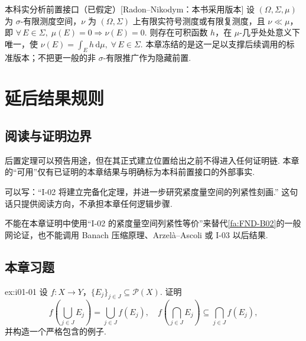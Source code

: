 \begin{FALightBox}{本科实分析前置接口（已假定）}[Radon--Nikodym：本书采用版本]
设 \(\displaystyle (\Omega,\Sigma,\mu)\) 为 \(\displaystyle \sigma\)-有限测度空间，\(\displaystyle \nu\) 为 \(\displaystyle (\Omega,\Sigma)\) 上有限实符号测度或有限复测度，且 \(\displaystyle \nu\ll\mu\)，即 \(\displaystyle \forall\,E\in\Sigma,\; \mu(E)=0\Longrightarrow\nu(E)=0\).
则存在可积函数 \(\displaystyle h\)，在 \(\displaystyle \mu\)-几乎处处意义下唯一，使 \(\displaystyle \nu(E)=\int_E h\,\mathrm{d}\mu, \; \forall\,E\in\Sigma\).
本章冻结的是这一足以支撑后续调用的标准版本；不把更一般的非 \(\displaystyle \sigma\)-有限推广作为隐藏前置.
\end{FALightBox}

\section{延后结果规则}\label{sec:i01-deferred}

\subsection{阅读与证明边界}

后置定理可以预告用途，但在其正式建立位置给出之前不得进入任何证明链. 本章的“可用”仅有已证明的本章结果与明确标为本科前置接口的外部事实.

\begin{FAExample}[合法预告]
可以写：“I-02 将建立完备化定理，并进一步研究紧度量空间的列紧性刻画.” 这句话只提供阅读方向，不承担本章任何逻辑步骤.
\end{FAExample}

\begin{FAWarning}[非法前向调用]
不能在本章证明中使用“I-02 的紧度量空间列紧性等价”来替代\autoref{fa:FND-B02}的一般网论证，也不能调用 Banach 压缩原理、Arzelà--Ascoli 或 I-03 以后结果.
\end{FAWarning}

\subsection{本章习题}\label{sec:i01-exercises}

\begin{FAExercise}[像与原像的量词核验]{ex:i01-01}
设 \(\displaystyle f:X\to Y\)，\(\displaystyle \{E_j\}_{j\in J}\subseteq\mathcal P(X)\). 证明
\[
f\!\left(\bigcup_{j\in J}E_j\right)=\bigcup_{j\in J}f(E_j),
\quad
f\!\left(\bigcap_{j\in J}E_j\right)\subseteq\bigcap_{j\in J}f(E_j),
\]
并构造一个严格包含的例子.
\end{FAExercise}

